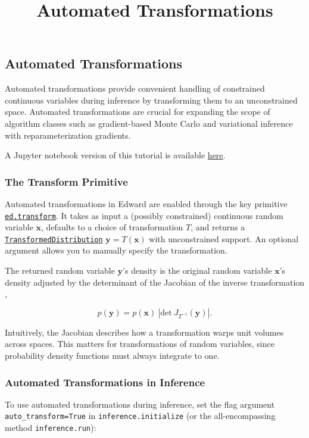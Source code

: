 \title{Automated Transformations}

\subsection{Automated Transformations}

Automated transformations provide convenient handling of constrained
continuous variables during inference by transforming them to an
unconstrained space. Automated transformations are crucial for
expanding the scope of algorithm classes such as gradient-based Monte
Carlo and variational inference with reparameterization gradients.

A Jupyter notebook version of this tutorial is available
\href{http://nbviewer.jupyter.org/github/blei-lab/edward/blob/master/notebooks/automated_transformations.ipynb}{here}.

\subsubsection{The Transform Primitive}

Automated transformations in Edward are enabled through the key
primitive
\href{/api/ed/transform}{\texttt{ed.transform}}.
It takes as input a (possibly constrained) continuous random variable
$\mathbf{x}$, defaults to a choice of transformation $T$, and returns a
\href{/api/ed/models/TransformedDistribution}
{\texttt{TransformedDistribution}}
$\mathbf{y}=T(\mathbf{x})$ with unconstrained support.
An optional argument allows you to manually specify the transformation.

The returned random variable $\mathbf{y}$'s density is the original
random variable $\mathbf{x}$'s density adjusted by the determinant of
the Jacobian of the inverse transformation \citep{casella2002statistical},

$$p(\mathbf{y}) = p(\mathbf{x})~|\mathrm{det}~J_{T^{-1}}(\mathbf{y}) |.$$

Intuitively, the Jacobian describes how a transformation warps unit
volumes across spaces. This matters for transformations of random
variables, since probability density functions must always integrate
to one.

\subsubsection{Automated Transformations in Inference}

To use automated transformations during inference, set the flag
argument \texttt{auto_transform=True} in \texttt{inference.initialize}
(or the all-encompassing method \texttt{inference.run}):

